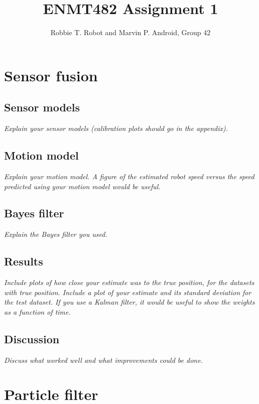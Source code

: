 \documentclass[a4paper,12pt]{article}
\title{ENMT482 Assignment 1}
\author{Robbie T. Robot and Marvin P. Android, Group 42}
\date{}
\newcommand{\comment}[1]{\emph{\color{blue}#1}}
\begin{document}
\maketitle

\section{Sensor fusion}


\subsection{Sensor models}

\comment{Explain your sensor models (calibration plots should go in
  the appendix).}


\subsection{Motion model}

\comment{Explain your motion model.  A figure of the estimated robot
  speed versus the speed predicted using your motion model would be
  useful.}


\subsection{Bayes filter}

\comment{Explain the Bayes filter you used.}


\subsection{Results}

\comment{Include plots of how close your estimate was to the true
  position, for the datasets with true position.  Include a plot of
  your estimate and its standard deviation for the test dataset.  If
  you use a Kalman filter, it would be useful to show the weights as a
  function of time.}


\subsection{Discussion}

\comment{Discuss what worked well and what improvements could be
  done.}


\section{Particle filter}
\end{document}
